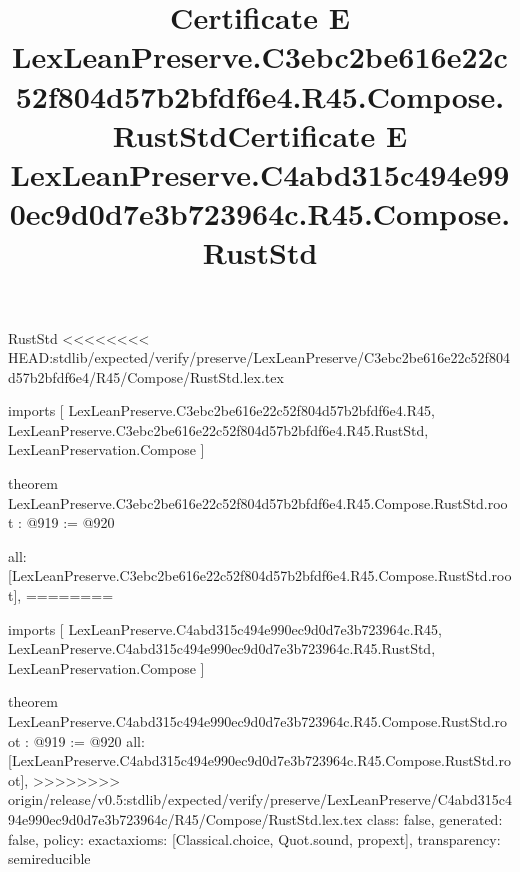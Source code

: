 \begin{lexlean}{RustStd}
<<<<<<<< HEAD:stdlib/expected/verify/preserve/LexLeanPreserve/C3ebc2be616e22c52f804d57b2bfdf6e4/R45/Compose/RustStd.lex.tex
\title{Certificate E LexLeanPreserve.C3ebc2be616e22c52f804d57b2bfdf6e4.R45.Compose.RustStd}
\begin{coremodule}
imports [
  LexLeanPreserve.C3ebc2be616e22c52f804d57b2bfdf6e4.R45,
  LexLeanPreserve.C3ebc2be616e22c52f804d57b2bfdf6e4.R45.RustStd,
  LexLeanPreservation.Compose
]

theorem LexLeanPreserve.C3ebc2be616e22c52f804d57b2bfdf6e4.R45.Compose.RustStd.root : @919 := @920 {
  all: [LexLeanPreserve.C3ebc2be616e22c52f804d57b2bfdf6e4.R45.Compose.RustStd.root],
========
\title{Certificate E LexLeanPreserve.C4abd315c494e990ec9d0d7e3b723964c.R45.Compose.RustStd}
\begin{coremodule}
imports [
  LexLeanPreserve.C4abd315c494e990ec9d0d7e3b723964c.R45,
  LexLeanPreserve.C4abd315c494e990ec9d0d7e3b723964c.R45.RustStd,
  LexLeanPreservation.Compose
]

theorem LexLeanPreserve.C4abd315c494e990ec9d0d7e3b723964c.R45.Compose.RustStd.root : @919 := @920 {
  all: [LexLeanPreserve.C4abd315c494e990ec9d0d7e3b723964c.R45.Compose.RustStd.root],
>>>>>>>> origin/release/v0.5:stdlib/expected/verify/preserve/LexLeanPreserve/C4abd315c494e990ec9d0d7e3b723964c/R45/Compose/RustStd.lex.tex
  class: false,
  generated: false,
  policy: exact{axioms: [Classical.choice, Quot.sound, propext]},
  transparency: semireducible
}


\end{coremodule}}
\end{coremodule}
\end{lexlean}
